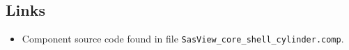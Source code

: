 \subsection*{Links}
\begin{itemize}
  \item Component source code found in file \texttt{SasView\_core\_shell\_cylinder.comp}.
\end{itemize}

